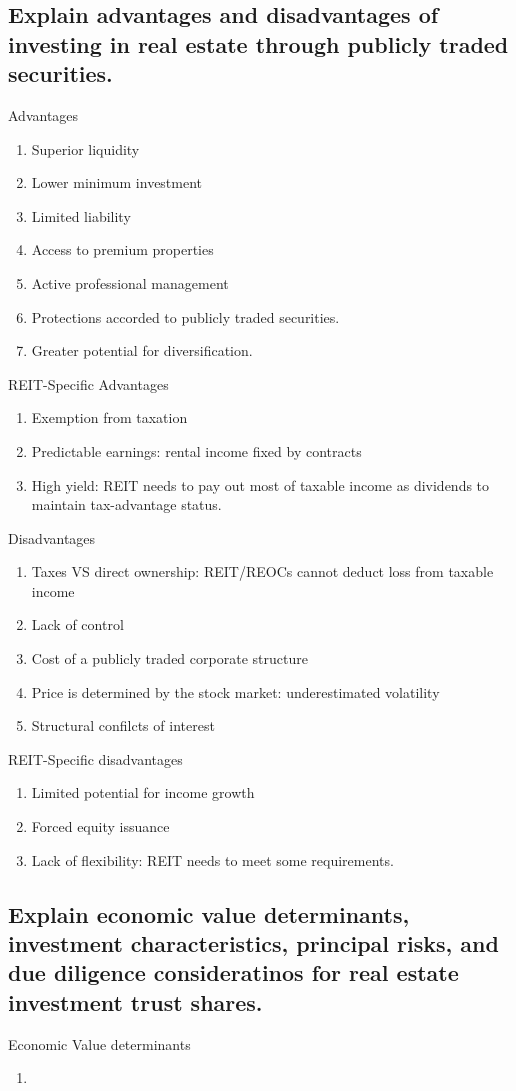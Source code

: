 \documentclass{article}
\newcommand{\be}{\begin{enumerate}}
\newcommand{\ee}{\end{enumerate}}
\begin{document}
\subsection{Explain advantages and disadvantages of investing in real estate through
publicly traded securities.}
Advantages
\be
    \item Superior liquidity
    \item Lower minimum investment
    \item Limited liability
    \item Access to premium properties
    \item Active professional management
    \item Protections accorded to publicly traded securities.
    \item Greater potential for diversification.
\ee
REIT-Specific Advantages
\be
    \item Exemption from taxation
    \item Predictable earnings: rental income fixed by contracts
    \item High yield: REIT needs to pay out most of taxable income as dividends to 
    maintain tax-advantage status.
\ee
Disadvantages
\be
    \item Taxes VS direct ownership: REIT/REOCs cannot deduct loss from taxable income
    \item Lack of control
    \item Cost of a publicly traded corporate structure
    \item Price is determined by the stock market: underestimated volatility
    \item Structural confilcts of interest
\ee
REIT-Specific disadvantages
\be 
    \item Limited potential for income growth
    \item Forced equity issuance
    \item Lack of flexibility: REIT needs to meet some requirements.
\ee
\subsection{Explain economic value determinants, investment characteristics, principal
risks, and due diligence consideratinos for real estate investment trust shares.}
Economic Value determinants
\be
    \item
\ee
\end{document}

